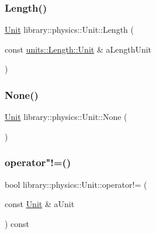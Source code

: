 \subsubsection{\texorpdfstring{Length()}{Length()}}
{\footnotesize\ttfamily \hyperlink{classlibrary_1_1physics_1_1_unit}{Unit} library\+::physics\+::\+Unit\+::\+Length (\begin{DoxyParamCaption}\item[{const \hyperlink{classlibrary_1_1physics_1_1units_1_1_length_a3b8b39cd245cf6b19dc34459baeccb18}{units\+::\+Length\+::\+Unit} \&}]{a\+Length\+Unit }\end{DoxyParamCaption})\hspace{0.3cm}{\ttfamily [static]}}

\mbox{\label{classlibrary_1_1physics_1_1_unit_ab25dd57cb71168898324ac78b43374ac}} 
\subsubsection{\texorpdfstring{None()}{None()}}
{\footnotesize\ttfamily \hyperlink{classlibrary_1_1physics_1_1_unit}{Unit} library\+::physics\+::\+Unit\+::\+None (\begin{DoxyParamCaption}{ }\end{DoxyParamCaption})\hspace{0.3cm}{\ttfamily [static]}}

\mbox{\label{classlibrary_1_1physics_1_1_unit_a2fc9c3b0ac228c6c0fedb2f63274a35f}} 
\subsubsection{\texorpdfstring{operator"!=()}{operator!=()}}
{\footnotesize\ttfamily bool library\+::physics\+::\+Unit\+::operator!= (\begin{DoxyParamCaption}\item[{const \hyperlink{classlibrary_1_1physics_1_1_unit}{Unit} \&}]{a\+Unit }\end{DoxyParamCaption}) const}

\mbox{\label{classlibrary_1_1physics_1_1_unit_af82a0c6b4bb9b9724823b6492c72aa46}} 
